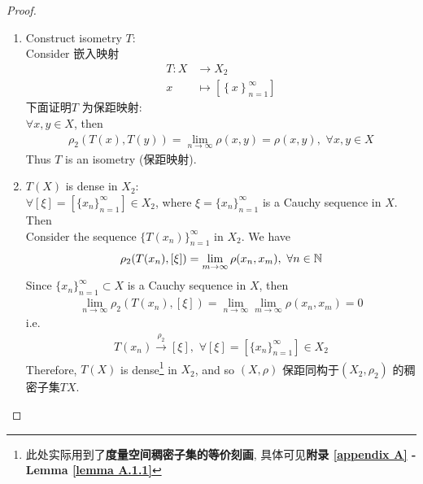 \begin{thm}
\begin{proof}
\begin{enumerate}
				\vspace{8em}
				
				\item Construct isometry $T$: \\
				Consider 嵌入映射
				\begin{align}
					T : X &\rightarrow X_2 \\
					x &\longmapsto [\left\{ x \right\}_{n = 1}^{\infty}]
				\end{align}
				下面证明$T$ 为保距映射: \\
				$\forall x , y \in X$, then
				\begin{align}
					\rho_2 (T(x) , T(y)) = \lim_{n \to \infty}{\rho(x , y)} = \rho(x , y) , \,\, \forall x,  y \in X
				\end{align}
				Thus $T$ is an isometry (保距映射).
				
				\newpage
				
				\item $T(X)$ is dense in $X_2$: \\
				$\forall [\xi] = [\{ x_n \}_{n = 1}^{\infty}] \in X_2$, where $\xi = \{ x_n \}_{n = 1}^{\infty}$ is a Cauchy sequence in $X$. Then \\
				Consider the sequence $\{ T(x_n) \}_{n = 1}^{\infty}$ in $X_2$. We have
				\begin{align}
					\rho_2(T(x_n) , [\xi]) = \lim_{m \to \infty}{\rho(x_n , x_m)} , \,\, \forall n \in \mathbb{N}
				\end{align}
				Since $\{ x_n \}_{n = 1}^{\infty} \subset X$ is a Cauchy sequence in $X$, then
				\begin{align}
					\lim_{n \to \infty}{\rho_2(T(x_n) , [\xi])} 
					= \lim_{n \to \infty} \lim_{m \to \infty}{\rho(x_n , x_m)} 
					= 0
				\end{align}
				i.e.
				\begin{align}
					T(x_n) \overset{\rho_2}{\to} [\xi] , \,\, \forall [\xi] = [\{ x_n \}_{n = 1}^{\infty}] \in X_2
				\end{align}
				Therefore, $T(X)$ is dense\footnote{此处实际用到了\textbf{度量空间稠密子集的等价刻画}, 具体可见\textbf{附录 \ref{appendix A} - Lemma \ref{lemma A.1.1}}} in $X_2$, and so $(X , \rho)$ 保距同构于$(X_2 , \rho_2)$ 的稠密子集$TX$.
				
				\vspace{6em}
				

\end{enumerate}
\end{proof}
\end{thm}
